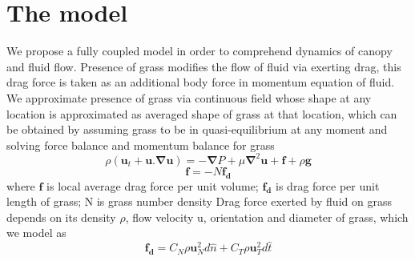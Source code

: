 \documentclass[aps,preprint,floatfix,prl]{revtex4-1}
\newcommand{\bu}{\mathbf{u}}
\newcommand{\grad}{\mathbf{\nabla}}
\begin{document}
\section{The model}
We propose a fully coupled model in order to comprehend dynamics of canopy and fluid flow. Presence of grass modifies the flow of fluid via exerting drag, this drag force is
taken as an additional body force in momentum equation of fluid. We approximate presence of grass via continuous field whose shape at any location is approximated as averaged 
shape of grass at that location, which can be obtained by assuming grass to be in quasi-equilibrium at any moment and solving force balance and momentum balance for grass  
\begin{equation}
\rho \left(\bu_{t}+\bu.\grad\bu \right) = -\grad P+\mu\grad^{2}\bu +\mathbf{f}+\rho\mathbf{g}
\end{equation}
\begin{equation}
 \mathbf{f}=-N\mathbf{f_{d}}
\end{equation}
where $\mathbf{f}$ is local average drag force per unit volume; $\mathbf{f_{d}}$ is drag force per unit length of grass; N is grass number density 
Drag force exerted by fluid on grass depends on its density $\rho$, flow velocity u, orientation and diameter of grass, which we model as 
\begin{equation}
 \mathbf{f_{d}}=C_{N}\rho\bu_{N}^{2}d\hat{n}+C_{T}\rho\bu_{T}^{2}d\hat{t}
\end{equation}
\end{document}
